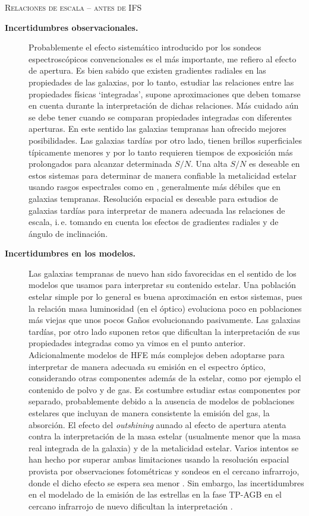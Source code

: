 \documentclass[xcolor=dvipsnames,4pt,hyperref={colorlinks,citecolor=black,linkcolor=black,urlcolor=black}]{beamer}
\begin{document}
\begin{frame}[allowframebreaks]{\textsc{Relaciones de escala -- antes de IFS}}
\begin{description}
%
\item[\textbf{Incertidumbres observacionales.}] Probablemente el efecto sistemático introducido por
los sondeos espectroscópicos convencionales es el más importante, me refiero al efecto de apertura.
Es bien sabido que existen gradientes radiales en las propiedades de las galaxias, por lo tanto,
estudiar las relaciones entre las propiedades físicas `integradas', supone aproximaciones que deben
tomarse en cuenta durante la interpretación de dichas relaciones. Más cuidado aún se debe tener
cuando se comparan propiedades integradas con diferentes aperturas. En este sentido las galaxias
tempranas han ofrecido mejores posibilidades. Las galaxias tardías por otro lado, tienen brillos
superficiales típicamente menores y por lo tanto requieren tiempos de exposición más prolongados
para alcanzar determinada $S/N$. Una alta $S/N$ es deseable en estos sistemas para determinar de
manera confiable la metalicidad estelar usando rasgos espectrales como en \citet{Gallazzi2005},
generalmente más débiles que en galaxias tempranas. Resolución espacial es deseable para estudios de
galaxias tardías para interpretar de manera adecuada las relaciones de escala, i.\,e. tomando en
cuenta los efectos de gradientes radiales y de ángulo de inclinación.
%
\item[\textbf{Incertidumbres en los modelos.}] Las galaxias tempranas de nuevo han sido favorecidas
en el sentido de los modelos que usamos para interpretar su contenido estelar. Una población estelar
simple por lo general es buena aproximación en estos sistemas, pues la relación masa luminosidad (en
el óptico) evoluciona poco en poblaciones más viejas que unos pocos Gaños evolucionando pasivamente.
Las galaxias tardías, por otro lado suponen retos que dificultan la interpretación de sus
propiedades integradas como ya vimos en el punto anterior. Adicionalmente modelos de HFE más
complejos deben adoptarse para interpretar de manera adecuada su emisión en el espectro óptico,
considerando otras componentes además de la estelar, como por ejemplo el contenido de polvo y de
gas. Es costumbre estudiar estas componentes por separado, probablemente debido a la ausencia de
modelos de poblaciones estelares que incluyan de manera consistente la emisión del gas, la
absorción. El efecto del \emph{outshining} aunado al efecto de apertura atenta contra la
interpretación de la masa estelar (usualmente menor que la masa real integrada de la galaxia) y de
la metalicidad estelar. Varios intentos se han hecho por superar ambas limitaciones usando la
resolución espacial provista por observaciones fotométricas \citep{Sorba2015} y sondeos en el
cercano infrarrojo, donde el dicho efecto se espera sea menor \citep{Eminian2008}. Sin embargo, las
incertidumbres en el modelado de la emisión de las estrellas en la fase TP-AGB en el cercano
infrarrojo de nuevo dificultan la interpretación \citep{Zibetti2013}.
%
\end{description}


\end{frame}
\end{document}
